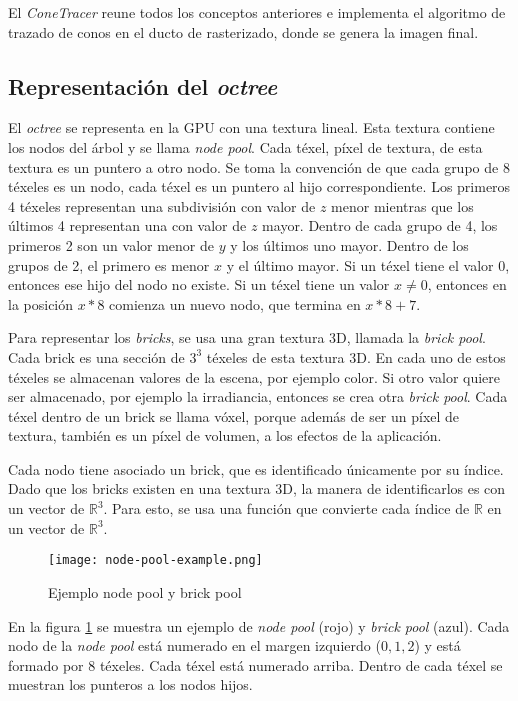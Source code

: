 El \textit{ConeTracer} reune todos los conceptos anteriores e implementa el algoritmo de trazado de conos en el ducto de rasterizado, donde se genera la imagen final.

\subsection{Representación del \textit{octree}}

El \textit{octree} se representa en la GPU con una textura lineal.
Esta textura contiene los nodos del árbol y se llama \textit{node pool}.
Cada téxel, píxel de textura, de esta textura es un puntero a otro nodo.
Se toma la convención de que cada grupo de 8 téxeles es un nodo, cada téxel es un puntero al hijo correspondiente.
Los primeros 4 téxeles representan una subdivisión con valor de $z$ menor mientras que los últimos 4 representan una con valor de $z$ mayor.
Dentro de cada grupo de 4, los primeros 2 son un valor menor de $y$ y los últimos uno mayor.
Dentro de los grupos de 2, el primero es menor $x$ y el último mayor.
Si un téxel tiene el valor $0$, entonces ese hijo del nodo no existe.
Si un téxel tiene un valor $x \not = 0$, entonces en la posición $x * 8$ comienza un nuevo nodo, que termina en $x * 8 + 7$.

Para representar los \textit{bricks}, se usa una gran textura 3D, llamada la \textit{brick pool}.
Cada brick es una sección de $3^3$ téxeles de esta textura 3D.
En cada uno de estos téxeles se almacenan valores de la escena, por ejemplo color.
Si otro valor quiere ser almacenado, por ejemplo la irradiancia, entonces se crea otra \textit{brick pool}.
Cada téxel dentro de un brick se llama vóxel, porque además de ser un píxel de textura, también es un píxel de volumen, a los efectos de la aplicación.

Cada nodo tiene asociado un brick, que es identificado únicamente por su índice.
Dado que los bricks existen en una textura 3D, la manera de identificarlos es con un vector de $\mathbb{R}^3$.
Para esto, se usa una función que convierte cada índice de $\mathbb{R}$ en un vector de $\mathbb{R}^3$.

\begin{figure}[h!]
    \centering
    \texttt{[image: node-pool-example.png]}
    \caption{Ejemplo node pool y brick pool}
    \label{fig:node_pool_example}
\end{figure}

En la figura \ref{fig:node_pool_example} se muestra un ejemplo de \textit{node pool} (rojo) y \textit{brick pool} (azul).
Cada nodo de la \textit{node pool} está numerado en el margen izquierdo ($0, 1, 2$) y está formado por $8$ téxeles.
Cada téxel está numerado arriba.
Dentro de cada téxel se muestran los punteros a los nodos hijos.


